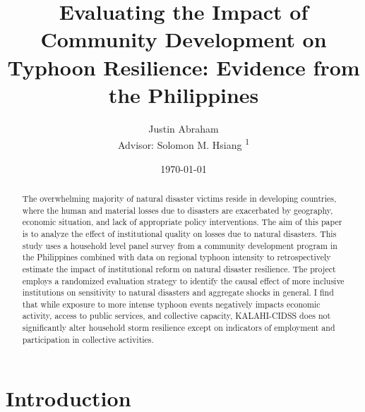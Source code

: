 \documentclass[12pt]{article}
\begin{document}
\title{Evaluating the Impact of Community Development on Typhoon Resilience: Evidence from the Philippines}
\author{Justin Abraham \\ Advisor: Solomon M. Hsiang \textsuperscript{1}}
\date{\today}
\maketitle

\begin{abstract}
	The overwhelming majority of natural disaster victims reside in developing countries, where the human and material losses due to disasters are exacerbated by geography, economic situation, and lack of appropriate policy interventions.  The aim of this paper is to analyze the effect of institutional quality on losses due to natural disasters. This study uses a household level panel survey from a community development program in the Philippines combined with data on regional typhoon intensity to retrospectively estimate the impact of institutional reform on natural disaster resilience. The project employs a randomized evaluation strategy to identify the causal effect of more inclusive institutions on sensitivity to natural disasters and aggregate shocks in general. I find that while exposure to more intense typhoon events negatively impacts economic activity, access to public services, and collective capacity, KALAHI-CIDSS does not significantly alter household storm resilience except on indicators of employment and participation in collective activities. 
\end{abstract}


\newpage

\section{Introduction}
	
\end{document}
